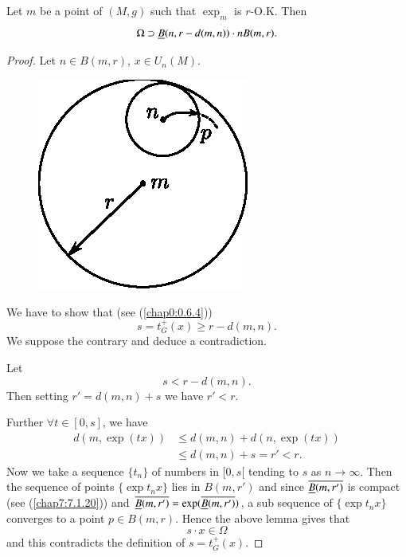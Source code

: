 \begin{lemma*}[7.3.2 bis]\label{chap7:7.3.2bis}
Let $m$ be a point of $(M,g)$ such that $\exp_{m}$ is $r$-O.K. Then
$$
\Omega\supset \underline{B}(n,r-d(m,n))\cdot nB(m,r).
$$
\end{lemma*}

\begin{proof}
Let $n\in B(m,r)$, $x\in U_{n}(M)$.
\begin{figure}[H]
\centering
\includegraphics{figures/chap7-fig3.eps}
\end{figure}
\noindent
We have to show that (see (\ref{chap0:0.6.4}))
$$
s=t^{+}_{G}(x)\geq r-d(m,n).
$$
We suppose the contrary and deduce a contradiction.

Let\pageoriginale
$$
s<r-d(m,n).
$$
Then setting $r'=d(m,n)+s$ we have $r'<r$.

Further $\forall t\in [0,s]$, we have
\begin{align*}
d(m,\exp(tx)) &\leq d(m,n)+d(n,\exp(tx))\\
              &\leq d(m,n)+s=r'<r.
\end{align*}
Now we take a sequence $\{t_{n}\}$ of numbers in $[0,s[$ tending to
    $s$ as $n\to \infty$. Then the sequence of points $\{\exp
    t_{n}x\}$ lies in $B(m,r')$ and since $\overline{\underline{B}(m,r')}$ is
    compact (see (\ref{chap7:7.1.20})) and
    $\overline{\underline{B}(m,r')}=\exp(\overline{\underline{B}(m,r')})$, a
    sub sequence of $\{\exp t_{n}x\}$ converges to a point $p\in
    B(m,r)$. Hence the above lemma gives that
$$
s\cdot x\in\Omega
$$
and this contradicts the definition of $s=t^{+}_{G}(x)$.
\end{proof}

\setcounter{subsection}{2}

\subsection{}\label{chap7:7.3.3}

